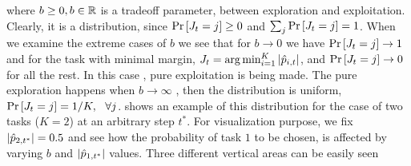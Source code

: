 where $b\geq 0, b\in\mathbb{R}$ is a tradeoff parameter, between exploration and
exploitation. Clearly, it is a distribution, since ${\rm Pr}\left[{J_t=j}\right]\geq 0$ and $\sum_j {\rm Pr}\left[{J_t=j}\right]=1$. 
When we examine the extreme cases  of $b$ we see that  for $b\rightarrow0$
we have ${\rm Pr}\left[{J_t=j}\right]\rightarrow1$ and  for the task with minimal margin, $J_t=\arg\min_{i=1}^K\left\vert{\hat{p}_{i,t}}\right\vert$,  and ${\rm Pr}\left[{J_t=j}\right]\rightarrow0$ for all the rest. In this case , pure exploitation is being made. The pure exploration happens when   $b\rightarrow \infty$
, then the distribution is uniform, $ {\rm Pr}\left[{J_t=j}\right]= 1/K,~~ \forall j $.  
shows an example of this distribution for the case of two tasks ($K=2$) at an arbitrary step $t^*$. 
For visualization purpose, we fix 
$\left\vert{\hat{p}_{2,t^*}}\right\vert=0.5$ and see how the probability of task $1$ to be chosen,
 is affected by varying $b$ and $\left\vert{\hat{p}_{1,t^*}}\right\vert$ values. 
 Three different vertical areas  can be easily seen 

